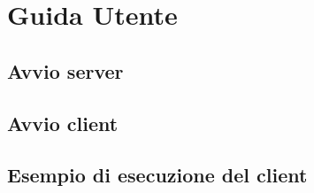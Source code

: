 \section{Guida Utente}
\subsection{Avvio server}

\subsection{Avvio client}

\subsection{Esempio di esecuzione del client}